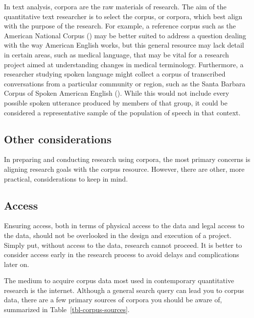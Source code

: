 \documentclass[
  letterpaper,
  krantz1]{latex/krantz-mod}
\theoremstyle{definition}
\theoremstyle{definition}
\theoremstyle{remark}
\begin{document}
In text analysis, corpora are the raw materials of
research. The aim of the quantitative text researcher is to select the
corpus, or corpora, which best align with the purpose of the research.
For example, a reference corpus such as the American National
Corpus () may be better suited to address a question dealing
with the way American English works, but this general resource may lack
detail in certain areas, such as medical language, that may be vital for
a research project aimed at understanding changes in medical
terminology. Furthermore, a researcher studying spoken language might
collect a corpus of transcribed conversations from a particular
community or region, such as the Santa Barbara Corpus of Spoken American
English
(). While this would not
include every possible spoken utterance produced by members of that
group, it could be considered a representative
sample of the population of
speech in that context.

\subsection{Other considerations}\label{other-considerations}

In preparing and conducting research using corpora, the most primary
concerns is aligning research goals with the corpus resource. However,
there are other, more practical, considerations to keep in mind.

\subsection{Access}\label{access}

Ensuring access, both in terms of physical access to the data and legal
access to the data, should not be overlooked in the design and execution
of a project. Simply put, without access to the data, research cannot
proceed. It is better to consider access early in the research process
to avoid delays and complications later on.

The medium to acquire corpus data most used in
contemporary quantitative research is
the internet. Although a general search query can lead you to corpus
data, there are a few primary sources of corpora you should be aware of,
summarized in Table~\ref{tbl-corpus-sources}.
\end{document}

